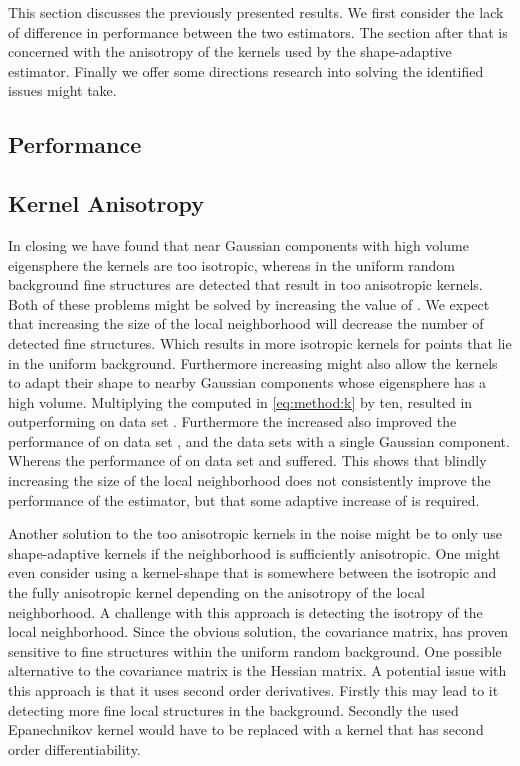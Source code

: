 This section discusses the previously presented results. We first consider the lack of difference in performance between the two estimators. The section after that is concerned with the anisotropy of the kernels used by the shape-adaptive estimator. Finally we offer some directions research into solving the identified issues might take.

\subsection{Performance}
\label{s:discussion:performance}


\subsection{Kernel Anisotropy}
\label{s:discussion:anisotropy}


In closing we have found that near Gaussian components with high volume eigensphere the kernels are too isotropic, whereas in the uniform random background fine structures are detected that result in too anisotropic kernels. Both of these problems might be solved by increasing the value of \KNNK. 
We expect that increasing the size of the local neighborhood will decrease the number of detected fine structures. Which results in more isotropic kernels for points that lie in the uniform background.
Furthermore increasing \KNNK might also allow the kernels to adapt their shape to nearby Gaussian components whose eigensphere has a high volume. Multiplying the \KNNK computed in \cref{eq:method:k} by ten, resulted in \sambe outperforming \mbe on data set \baakmanFive. Furthermore the increased \KNNK also improved the performance of \sambe on data set \ferdosiThree, \baakmanThree and the data sets with a single Gaussian component. Whereas the performance of \sambe on data set \ferdosiTwo and \baakmanTwo suffered. This shows that blindly increasing the size of the local neighborhood does not consistently improve the performance of the estimator, but that some adaptive increase of \KNNK is required.

Another solution to the too anisotropic kernels in the noise might be to only use shape-adaptive kernels if the neighborhood is sufficiently anisotropic. One might even consider using a kernel-shape that is somewhere between the isotropic and the fully anisotropic kernel depending on the anisotropy of the local neighborhood. A challenge with this approach is detecting the isotropy of the local neighborhood. Since the obvious solution, the covariance matrix, has proven sensitive to fine structures within the uniform random background.
One possible alternative to the covariance matrix is the Hessian matrix. A potential issue with this approach is that it uses second order derivatives. Firstly this may lead to it detecting more fine local structures in the background. Secondly the used Epanechnikov kernel would have to be replaced with a kernel that has second order differentiability.

